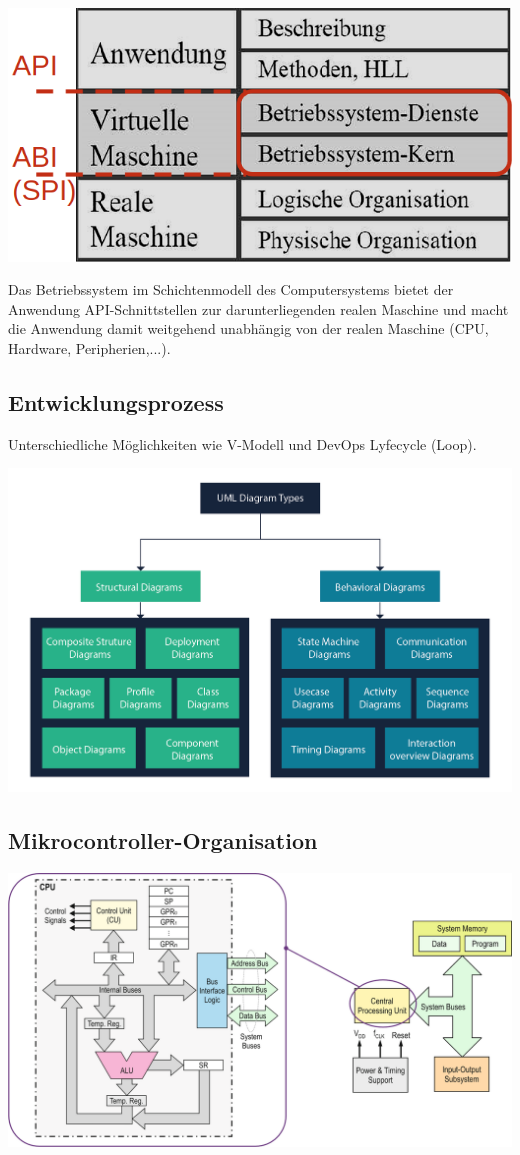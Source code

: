 \begin{center}
	\includegraphics[width=.6\linewidth]{"Images/Schichtmodell.png"}
\end{center}

Das Betriebssystem im Schichtenmodell des Computersystems bietet der Anwendung API-Schnittstellen zur darunterliegenden realen Maschine und macht die Anwendung damit weitgehend unabhängig von der realen Maschine (CPU, Hardware, Peripherien,...).

\subsection{Entwicklungsprozess}

Unterschiedliche Möglichkeiten wie V-Modell und DevOps Lyfecycle (Loop).

\includegraphics[width=\linewidth]{"Images/UML-Diagram-types-1.png"}

\subsection{Mikrocontroller-Organisation}

\includegraphics[width=\linewidth]{"Images/MikrocontrollerOrganisation.png"}

